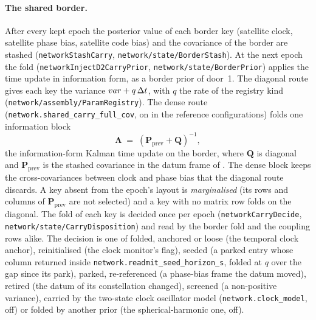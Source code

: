 \documentclass[main.tex]{subfiles}
\begin{document}
\paragraph{The shared border.}
After every kept epoch the posterior value of each border key (satellite
clock, satellite phase bias, satellite code bias) and the covariance of
the border are stashed (\texttt{networkStashCarry},
\texttt{network/state/BorderStash}).  At the next epoch the fold
(\texttt{networkInjectD2CarryPrior}, \texttt{network/state/BorderPrior})
applies the time update in information form, as a border prior of door~1.
The diagonal route gives each key the variance
$var + q\,\Delta t$, with $q$ the rate of the registry kind
(\texttt{network/assembly/ParamRegistry}).  The dense route
(\texttt{network.shared\_carry\_full\_cov}, on in the reference
configurations) folds one information block
\begin{equation}
\bm{\Lambda} \;=\; \left(\bm{P}_{\text{prev}} + \bm{Q}\right)^{-1},
\label{eq:carry-border-dense}
\end{equation}
the information-form Kalman time update on the border, where $\bm{Q}$
is diagonal and $\bm{P}_{\text{prev}}$ is the stashed covariance in the
datum frame of .  The
dense block keeps the cross-covariances between clock and phase bias
that the diagonal route discards.  A key absent from the epoch's layout
is \emph{marginalised} (its rows and columns of $\bm{P}_{\text{prev}}$ are
not selected) and a key with no matrix row folds on the diagonal.  The
fold of each key is decided once per epoch
(\texttt{networkCarryDecide}, \texttt{network/state/CarryDisposition}) and
read by the border fold and the coupling rows alike.  The decision is one
of folded, anchored or loose (the temporal clock anchor), reinitialised
(the clock monitor's flag), seeded (a parked entry whose column returned
inside \texttt{network.readmit\_seed\_horizon\_s}, folded at $q$ over the
gap since its park), parked, re-referenced (a phase-bias frame the datum
moved), retired (the datum of its constellation changed), screened (a
non-positive variance), carried by the two-state clock oscillator model
(\texttt{network.clock\_model}, off) or folded by another prior (the
spherical-harmonic one, off).
\end{document}
